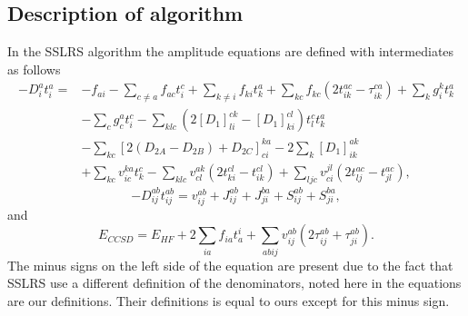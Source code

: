 \documentclass[a4paper,norsk,11pt,twoside]{report}
\begin{document}
\subsection{Description of algorithm}

In the SSLRS algorithm the amplitude equations are defined with intermediates as follows
\begin{align}
- D_i^a t_i^a = &
- f_{ai} 
- \sum_{c \not= a} f_{ac} t_i^c 
+ \sum_{k \not= i} f_{ki} t_k^a
+ \sum_{kc} f_{kc} (2t_{ik}^{ac} - \tau_{ik}^{ca})
+ \sum_k g_i^k t_k^a \label{SSRS1} \\ &
- \sum_c g_c^a t_i^c 
- \sum_{klc} \left( 2 [D_1]_{li}^{ck} - [D_1]_{ki}^{cl} \right) t_l^c t_k^a \nonumber \\ &
- \sum_{kc} [2(D_{2A} - D_{2B}) + D_{2C}]_{ci}^{ka} 
- 2 \sum_k [D_1]_{ik}^{ak}  \nonumber \\ &
+ \sum_{kc} v_{ic}^{ka} t_k^c
- \sum_{klc} v_{cl}^{ak} ( 2 t_{ki}^{cl} - t_{ik}^{cl} )
+ \sum_{ljc} v_{ci}^{jl} ( 2 t_{lj}^{ac} - t_{jl}^{ac} ),
\nonumber
\end{align}
\begin{equation}
- D_{ij}^{ab} t_{ij}^{ab} = v_{ij}^{ab} + J_{ij}^{ab} + J_{ji}^{ba} + S_{ij}^{ab} + S_{ji}^{ba}, \label{SSRS2}
\end{equation}
and
\begin{equation}
E_{CCSD} = E_{HF} + 2\sum_{ia} f_{ia} t_a^i 
+ \sum_{abij} v_{ij}^{ab} ( 2 \tau_{ij}^{ab}
+ \tau_{ji}^{ab} ) . \label{SSRS3}
\end{equation}
The minus signs on the left side of the equation are present due to
the fact that SSLRS use a different definition of the denominators,
noted here in the equations are our definitions. Their definitions is
equal to ours except for this minus sign. \\
\end{document}
